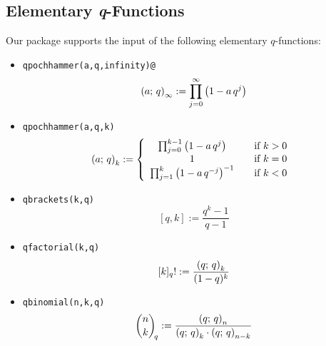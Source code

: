 \subsection{Elementary \textsl{q}-Functions}

Our package supports the input of the following elementary 
$q$-functions:
\begin{itemize}
%
\item \texttt{qpochhammer(a,q,infinity)@}\[
	\left(a;\,q\right)_{\infty}:= \prod_{j=0}^{\infty}{\left(1-a\,q^j\right)}
	\]
\item \texttt{qpochhammer(a,q,k)} \[
	\left(a;\,q\right)_{k}:= 
         \left\{\begin{array}{ccc}
           \prod_{j=0}^{k-1}{\left(1-a\,q^j\right)} && \mbox{{if} $k>0$ } \\
           1 && \mbox{{if} $k=0$ } \\
           \prod_{j=1}^{k}{\left(1-a\,q^{-j}\right)^{-1}} && \mbox{{if} $k<0$ }
         \end{array}\right.
	\]
\item  \texttt{qbrackets(k,q)}
	\[  {}[q,k]:=\frac{q^k-1}{q-1}  \]
\item  \texttt{qfactorial(k,q)}
	\[   {}[k]_q!:= \frac{\left(q;\,q\right)_{k}}{(1-q)^k}  \]
\item  \texttt{qbinomial(n,k,q)}
	\[  {\binom{n}{k}\!}_q:=
		\frac{\left(q;\,q\right)_{n}}{\left(q;\,q\right)_{k}\cdot\left(q;\,q\right)_{n-k}} \]
\end{itemize}

